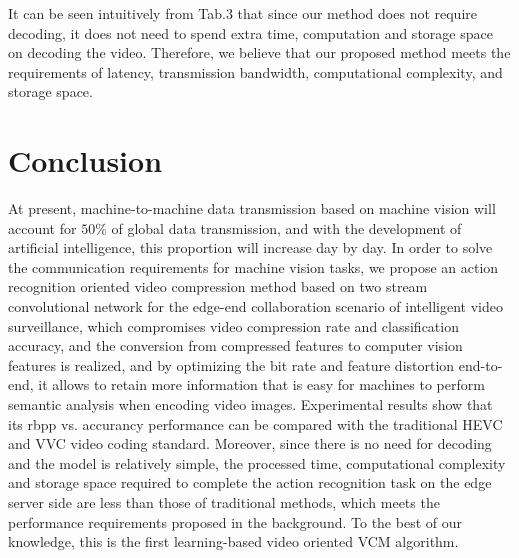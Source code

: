 \documentclass[a4paper]{cas-sc}
\begin{document}
It can be seen intuitively from Tab.3 that since our method does not require decoding, 
it does not need to spend extra time, computation and storage space on decoding the video. 
Therefore, we believe that our proposed method meets the requirements of latency, 
transmission bandwidth, computational complexity, and storage space.\\

\section{Conclusion}

At present, machine-to-machine data transmission based on machine vision will account for $50\%$ of global data transmission, 
and with the development of artificial intelligence, this proportion will increase day by day. 
In order to solve the communication requirements for machine vision tasks, 
we propose an action recognition oriented video compression method based on two stream convolutional network for 
the edge-end collaboration scenario of intelligent video surveillance, 
which compromises video compression rate and classification accuracy, 
and the conversion from compressed features to computer vision features is realized, 
and by optimizing the bit rate and feature distortion end-to-end, 
it allows to retain more information that is easy for machines to perform semantic analysis when encoding video images. 
Experimental results show that its rbpp vs. accurancy performance can be compared with the traditional HEVC and VVC video coding standard. 
Moreover, since there is no need for decoding and the model is relatively simple, 
the processed time, 
computational complexity and storage space required to complete the action recognition task on the edge server side are less 
than those of traditional methods, 
which meets the performance requirements proposed in the background. 
To the best of our knowledge, this is the first learning-based video oriented VCM algorithm.

\end{document}

